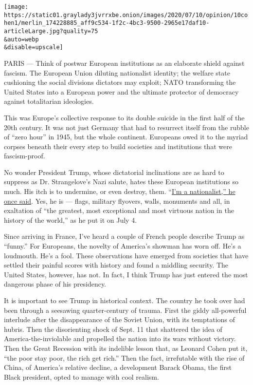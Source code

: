 \texttt{[image: https://static01.graylady3jvrrxbe.onion/images/2020/07/10/opinion/10cohen1/merlin\_174228885\_aff9c534-1f2c-4bc3-9500-2965e17daf10-articleLarge.jpg?quality=75\\\&auto=webp\\\&disable=upscale]}

PARIS --- Think of postwar European institutions as an elaborate shield
against fascism. The European Union diluting nationalist identity; the
welfare state cushioning the social divisions dictators may exploit;
NATO transforming the United States into a European power and the
ultimate protector of democracy against totalitarian ideologies.

This was Europe's collective response to its double suicide in the first
half of the 20th century. It was not just Germany that had to resurrect
itself from the rubble of ``zero hour'' in 1945, but the whole
continent. Europeans owed it to the myriad corpses beneath their every
step to build societies and institutions that were fascism-proof.

No wonder President Trump, whose dictatorial inclinations are as hard to
suppress as Dr. Strangelove's Nazi salute, hates these European
institutions so much. His itch is to undermine, or even destroy, them.
``\href{https://www.nytimes3xbfgragh.onion/2018/10/23/us/politics/nationalist-president-trump.html}{I'm
a nationalist,'' he once said}. Yes, he is --- flags, military flyovers,
walls, monuments and all, in exaltation of ``the greatest, most
exceptional and most virtuous nation in the history of the world,'' as
he put it on July 4.

Since arriving in France, I've heard a couple of French people describe
Trump as ``funny.'' For Europeans, the novelty of America's showman has
worn off. He's a loudmouth. He's a fool. These observations have emerged
from societies that have settled their painful scores with history and
found a middling security. The United States, however, has not. In fact,
I think Trump has just entered the most dangerous phase of his
presidency.

It is important to see Trump in historical context. The country he took
over had been through a seesawing quarter-century of trauma. First the
giddy all-powerful interlude after the disappearance of the Soviet
Union, with its temptations of hubris. Then the disorienting shock of
Sept. 11 that shattered the idea of America-the-inviolable and propelled
the nation into its wars without victory. Then the Great Recession with
its indelible lesson that, as Leonard Cohen put it, ``the poor stay
poor, the rich get rich.'' Then the fact, irrefutable with the rise of
China, of America's relative decline, a development Barack Obama, the
first Black president, opted to manage with cool realism.

